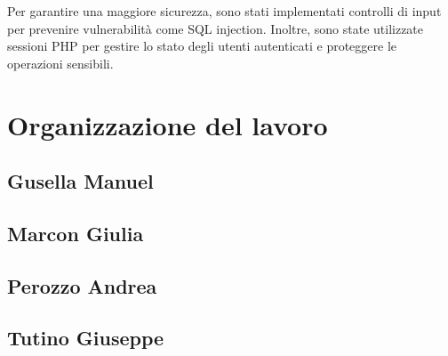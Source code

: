\documentclass[10pt]{article}
\begin{document}
Per garantire una maggiore sicurezza, sono stati implementati controlli di input per prevenire vulnerabilit\`a come SQL injection. Inoltre, sono state utilizzate sessioni PHP per gestire lo stato degli utenti autenticati e proteggere le operazioni sensibili.

\section{Organizzazione del lavoro}
\subsection{Gusella Manuel}
\subsection{Marcon Giulia}
\subsection{Perozzo Andrea}
\subsection{Tutino Giuseppe}
\end{document}
